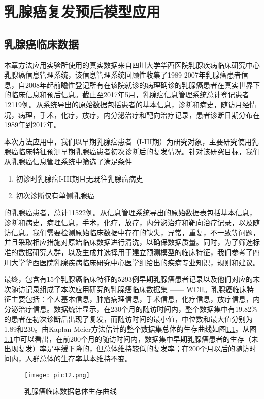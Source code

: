 \chapter{乳腺癌复发预后模型应用}

\section{乳腺癌临床数据}
本章方法应用实验所使用的真实数据来自四川大学华西医院乳腺疾病临床研究中心乳腺癌信息管理系统，该信息管理系统回顾性收集了1989-2007年乳腺癌患者信息，自2008年起前瞻性登记所有在该院就诊的病理确诊的乳腺癌患者在真实世界下的临床信息和预后信息。截止至2017年5月，乳腺癌信息管理系统总计登记患者12119例。从系统导出的原始数据包括患者的基本信息，诊断和病史，随访月经情况，病理，手术，化疗，放疗，内分泌治疗和靶向治疗记录，患者诊断日期分布在1989年到2017年。

本次方法应用中，我们以早期乳腺癌患者（I-III期）为研究对象，主要研究使用乳腺癌临床特征预测早期乳腺癌患者初次诊断后的复发情况。针对该研究目标，我们从乳腺癌信息管理系统中筛选了满足条件
\begin{enumerate}
	\item 初诊时乳腺癌I-III期且无既往乳腺癌病史
	\item 初次诊断仅有单侧乳腺癌
\end{enumerate}
的乳腺癌患者，总计11522例。从信息管理系统导出的原始数据表包括基本信息，诊断和病史，病理信息，手术，化疗，放疗，内分泌治疗和靶向治疗记录，以及随访信息。我们需要检测原始临床数据中存在的缺失，异常，重复，不一致等问题，并且采取相应措施对原始临床数据进行清洗，以确保数据质量。同时，为了筛选标准的数据研究人群，以及生成并选择用于建立预测模型的临床特征，我们参考了四川大学华西医院乳腺疾病临床研究中心医学组给出的疾病专业知识，规则和建议。

最终，包含有15个乳腺癌临床特征的5293例早期乳腺癌患者记录以及他们对应的末次随访记录组成了本次应用研究的乳腺癌临床数据集 —— WCH。乳腺癌临床特征主要包括：个人基本信息，肿瘤病理信息，手术信息，化疗信息，放疗信息，内分泌治疗信息。数据统计显示，在230个月的随访时间内，整个数据集中有19.82\%的患者在初次诊断后出现了复发，而随访时间的最小值，中位数和最大值分别为1,89和230。由Kaplan-Meier方法估计的整个数据集总体的生存曲线如图\ref{pic12}。从图\ref{pic12}中可以看出，在前200个月的随访时间内，数据集中早期乳腺癌患者的生存（未出现复发）率是平缓下降的，但总体维持较低的复发率；在200个月以后的随访时间内，人群总体的生存率基本维持不变。

\begin{figure}[H]
\texttt{[image: pic12.png]}
\caption{乳腺癌临床数据总体生存曲线}
\label{pic12}
\end{figure}

